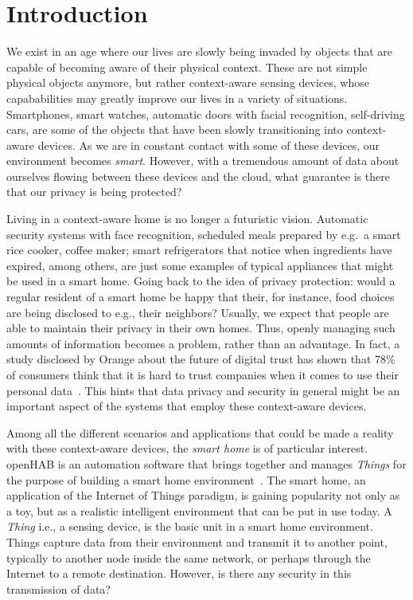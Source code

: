 \documentclass[12pt]{article}
\newcommand{\TODO}{\todo[inline]}
\begin{document}
\newpage
\section{Introduction}
\TODO{LIST OF FIGURES AND TABLES}
We exist in an age where our lives are slowly being invaded by objects that are capable of becoming aware of their physical context. These are not simple physical objects anymore, but rather context-aware sensing devices, whose capababilities may greatly improve our lives in a variety of situations. Smartphones, smart watches, automatic doors with facial recognition, self-driving cars, are some of the objects that have been slowly transitioning into context-aware devices. As we are in constant contact with some of these devices, our environment becomes \emph{smart}. However, with a tremendous amount of data about ourselves flowing between these devices and the cloud, what guarantee is there that our privacy is being protected?

Living in a context-aware home is no longer a futuristic vision. Automatic security systems with face recognition, scheduled meals prepared by e.g.\ a smart rice cooker, coffee maker; smart refrigerators that notice when ingredients have expired, among others, are just some examples of typical appliances that might be used in a smart home. Going back to the idea of privacy protection: would a regular resident of a smart home be happy that their, for instance, food choices are being disclosed to e.g., their neighbors? Usually, we expect that people are able to maintain their privacy in their own homes. Thus, openly managing such amounts of information becomes a problem, rather than an advantage. In fact, a study disclosed by Orange about the future of digital trust has shown that 78\% of consumers think that it is hard to trust companies when it comes to use their personal data~\cite{orange}. This hints that data privacy and security in general might be an important aspect of the systems that employ these context-aware devices. 

Among all the different scenarios and applications that could be made a reality with these context-aware devices, the \emph{smart home} is of particular interest. openHAB is an automation software that brings together and manages \emph{Things} for the purpose of building a smart home environment~\cite{openhab_02}. The smart home, an application of the Internet of Things paradigm, is gaining popularity not only as a toy, but as a realistic intelligent environment that can be put in use today. A \emph{Thing} i.e., a sensing device, is the basic unit in a smart home environment. Things capture data from their environment and transmit it to another point, typically to another node inside the same network, or perhaps through the Internet to a remote destination. However, is there any security in this transmission of data?
\end{document}

